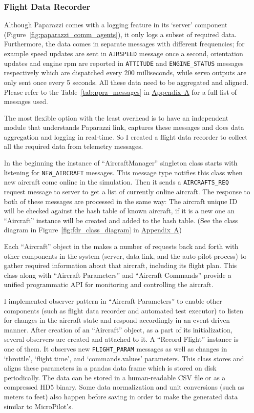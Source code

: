 \subsubsection{Flight Data Recorder}
Although Paparazzi comes with a logging feature in its `server' component (Figure~\ref{fig:paparazzi_comm_agents}), it only logs a subset of required data. Furthermore, the data comes in separate messages with different frequencies; for example speed updates are sent in \verb|AIRSPEED| message once a second, orientation updates and engine rpm are reported in \verb|ATTITUDE| and \verb|ENGINE_STATUS| messages respectively which are dispatched every 200 milliseconds, while servo outputs are only sent once every 5 seconds. All these data need to be aggregated and aligned. Please refer to the Table~\ref{tab:pprz_messages} in \hyperref[appendixa]{Appendix~A} for a full list of messages used.

The most flexible option with the least overhead is to have an independent module that understands Paparazzi link, captures these messages and does data aggregation and logging in real-time. So I created a flight data recorder to collect all the required data from telemetry messages.

In the beginning the instance of ``AircraftManager'' singleton class starts with listening for \verb|NEW_AIRCRAFT| messages. This message type notifies this class when new aircraft come online in the simulation. Then it sends a \verb|AIRCRAFTS_REQ| request message to server to get a list of currently online aircraft. The response to both of these messages are processed in the same way: The aircraft unique ID will be checked against the hash table of known aircraft, if it is a new one an ``Aircraft'' instance will be created and added to the hash table. (See the class diagram in Figure~\ref{fig:fdr_class_diagram} in \hyperref[appendixa]{Appendix~A})

Each ``Aircraft'' object in the makes a number of requests back and forth with other components in the system (server, data link, and the auto-pilot process) to gather required information about that aircraft, including its flight plan. This class along with ``Aircraft Parameters'' and ``Aircraft Commands'' provide a unified programmatic API for monitoring and controlling the aircraft. 

I implemented observer pattern \cite{gamma1995design} in ``Aircraft Parameters'' to enable other components (such as flight data recorder and automated test executor) to listen for changes in the aircraft state and respond accordingly in an event-driven manner. 
After creation of an ``Aircraft'' object, as a part of its initialization, several observers are created and attached to it. A ``Record Flight'' instance is one of them. It observes new \verb|FLIGHT_PARAM| messages as well as changes in `throttle', `flight time', and `commands.values' parameters. This class stores and aligns these parameters in a pandas data frame which is stored on disk periodically. The data can be stored in a human-readable CSV file or as a compressed HD5 binary. Some data normalization and unit conversions (such as meters to feet) also happen before saving in order to make the generated data similar to MicroPilot's.

